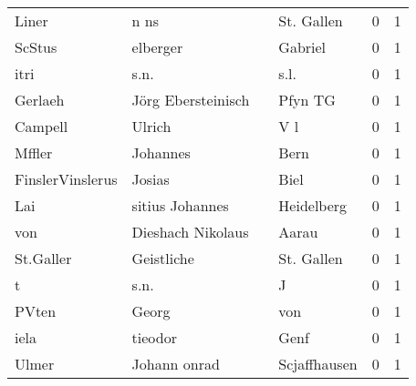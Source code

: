 \documentclass[10pt,a4paper,landscape]{article}
\begin{document}
\begin{longtable}{llllrr}
                    Liner &                               n ns &             &                                  St. Gallen &          0 &         1 \\
                   ScStus &                           elberger &             &                                     Gabriel &          0 &         1 \\
                     itri &                               s.n. &             &                                        s.l. &          0 &         1 \\
                  Gerlaeh &                 Jörg Ebersteinisch &             &                                     Pfyn TG &          0 &         1 \\
                  Campell &                             Ulrich &             &                                         V l &          0 &         1 \\
                   Mffler &                           Johannes &             &                                        Bern &          0 &         1 \\
         FinslerVinslerus &                             Josias &             &                                        Biel &          0 &         1 \\
                      Lai &                    sitius Johannes &             &                                  Heidelberg &          0 &         1 \\
                      von &                  Dieshach Nikolaus &             &                                       Aarau &          0 &         1 \\
                St.Galler &                         Geistliche &             &                                  St. Gallen &          0 &         1 \\
                        t &                               s.n. &             &                                           J &          0 &         1 \\
                    PVten &                              Georg &             &                                         von &          0 &         1 \\
                     iela &                            tieodor &             &                                        Genf &          0 &         1 \\
                    Ulmer &                       Johann onrad &             &                                Scjaffhausen &          0 &         1 \\

\end{longtable}
\end{document}
